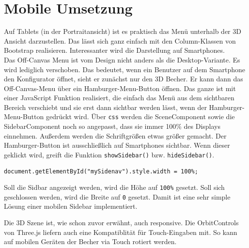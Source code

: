 \section{Mobile Umsetzung}
\label{sec:umsetzung}
%
Auf Tablets (in der Portraitansicht) ist es praktisch das Menü unterhalb der 3D Ansicht darzustellen. Das lässt sich ganz einfach mit den Column-Klassen von Bootstrap realisieren. Interessanter wird die Darstellung auf Smartphones.\\
Das Off-Canvas Menu ist vom Design nicht anders als die Desktop-Variante. Es wird lediglich verschoben. Das bedeutet, wenn ein Benutzer auf dem Smartphone den Konfigurator öffnet, sieht er zunächst nur den 3D Becher. Er kann dann das Off-Canvas-Menu über ein Hamburger-Menu-Button öffnen. Das ganze ist mit einer JavaScript Funktion realisiert, die einfach das Menü aus dem sichtbaren Bereich verschiebt und sie erst dann sichtbar werden lässt, wenn der Hamburger-Menu-Button gedrückt wird. Über \texttt{css} werden die SceneComponent sowie die SidebarComponent noch so angepasst, dass sie immer 100\% des Displays einnehmen. Außerdem werden die Schriftgrößen etwas größer gemacht.
Der Hamburger-Button ist ausschließlich auf Smartphones sichtbar. Wenn dieser geklickt wird, greift die Funktion \texttt{showSidebar()} bzw. \texttt{hideSidebar()}.
%
\begin{lstlisting}[caption={Ausschnitt der ShowSidebar()-Funktion},label=lst:showsidebar]
document.getElementById("mySidenav").style.width = 100%;
\end{lstlisting}
%
Soll die Sidbar angezeigt werden, wird die Höhe auf \texttt{100\%} gesetzt. Soll sich geschlossen werden, wird die Breite auf \texttt{0} gesetzt. Damit ist eine sehr simple Lösung einer mobilen Sidebar implementiert.

Die 3D Szene ist, wie schon zuvor erwähnt, auch responsive. Die OrbitControls von Three.js liefern auch eine Kompatiblität für Touch-Eingaben mit. So kann auf mobilen Geräten der Becher via Touch rotiert werden.
%
